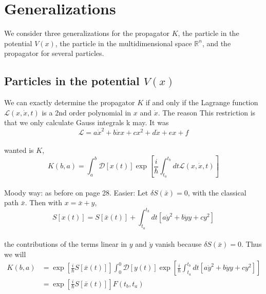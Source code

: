 \section{Generalizations}
We consider three generalizations for the propagator $K$, the particle
in the potential $V (x)$, the particle in the multidimensional space $\mathbb{R}^n$, and
the propagator for several particles.

\subsection{Particles in the potential $V (x)$}
We can exactly determine the propagator $K$ if and only if the Lagrange function
$\mathcal{L} (x, \dot{x}, t)$ is a 2nd order polynomial in $x$ and $\dot{x}$. The reason
This restriction is that we only calculate Gauss integrals
k may. It was
\\
\begin{equation}
\mathcal{L}=a \dot{x}^{2}+b \dot{x} x+c x^{2}+d \dot{x}+e x+f
\end{equation}\\
wanted is $K$,
\\
\begin{equation}
K(b, a)=\int_{a}^{b} \mathcal{D}[x(t)] \exp \left[\frac{i}{\hbar} \int_{t_{a}}^{t_{b}} d t \mathcal{L}(x, \dot{x}, t)\right]
\end{equation}\\
Moody way: as before on page 28. Easier: Let $\delta S(\bar{x}) = 0$, with the
classical path $\bar{x}$. Then with $x = \bar{x} + y$,
\\
\begin{equation}
S[x(t)]=S[\bar{x}(t)]+\int_{t_{a}}^{t_{b}} d t\left[a \dot{y}^{2}+b \dot{y} y+c y^{2}\right]
\end{equation}\\
the contributions of the terms linear in $y$ and $\dot{y}$ vanish because $\delta S (\bar{x}) = 0$. Thus
we will
\\
\begin{equation}
\begin{aligned} K(b, a) &=\exp \left[\frac{i}{\hbar} S[\bar{x}(t)]\right] \int_{0}^{0} \mathcal{D}[y(t)] \exp \left[\frac{i}{\hbar} \int_{t_{a}}^{t_{b}} d t\left[a \dot{y}^{2}+b \dot{y} y+c y^{2}\right]\right] \\ &=\exp \left[\frac{i}{\hbar} S[\bar{x}(t)]\right] F\left(t_{b}, t_{a}\right) \end{aligned}
\end{equation}\\
